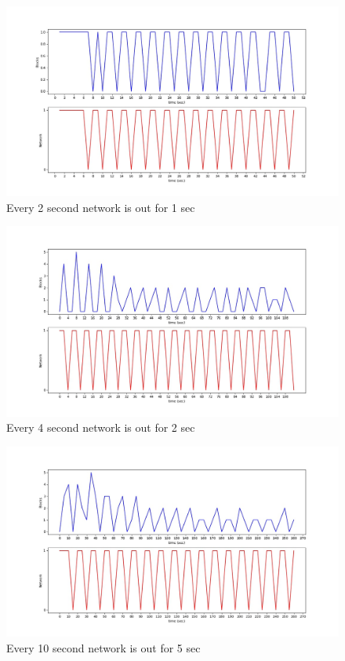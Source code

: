 \begin{figure}[!h]
    \centering
    \includegraphics[width=1\textwidth]{images/1_2.jpg}
    \caption{Every 2 second network is out for 1 sec}
    \label{fig:1_2}
\end{figure}
\begin{figure}[!h]
    \centering
    \includegraphics[width=1\textwidth]{images/2_4.jpg}
    \caption{Every 4 second network is out for 2 sec}
    \label{fig:2_4}
\end{figure}
\begin{figure}[!h]
    \centering
    \includegraphics[width=1\textwidth]{images/5_10.jpg}
    \caption{Every 10 second network is out for 5 sec}
    \label{fig:5_10}
\end{figure}
